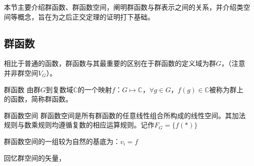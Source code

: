 
\begin{issues}
\issueDraft
\issueTODO
\end{issues}

本节主要介绍群函数、群函数空间，阐明群函数与群表示之间的关系，并介绍类空间等概念，旨在为之后正交定理的证明打下基础。

\subsection{群函数}

相比于普通的函数，群函数与其最重要的区别在于群函数的定义域为群$G$，（注意并非群空间$V_G$）。
\begin{definition}{群函数}
由群$G$到复数域$\mathbb{C}$的一个映射$f$：$G\longmapsto \mathbb{C}$，$\forall g\in G$，$f(g)\in \mathbb{C}$被称为群上的函数，简称群函数。
\end{definition}

\begin{definition}{群函数空间}
群函数空间是所有群函数的任意线性组合所构成的线性空间。其加法规则与数乘规则均遵循复数的相应运算规则。记作$F_G=\{f(*)\}$
\end{definition}

群函数空间的一组较为自然的基底为：$v_i=f$

回忆群空间的矢量，